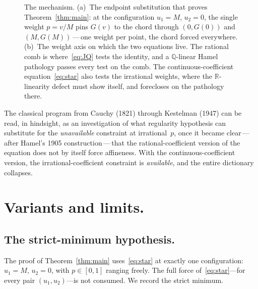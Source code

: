 \documentclass{article}
\theoremstyle{plain}
\theoremstyle{definition}
\newcommand{\R}{\mathbb{R}}
\newcommand{\Q}{\mathbb{Q}}
\begin{document}
\begin{figure}[ht]
{%
}
\caption{The mechanism. (a)~The endpoint substitution that proves
Theorem~\ref{thm:main}: at the configuration $u_1=M$, $u_2=0$, the
single weight $p=v/M$ pins $G(v)$ to the chord through $(0,G(0))$ and
$(M,G(M))$\,---\,one weight per point, the chord forced everywhere.
(b)~The weight axis on which the two equations live. The rational comb
is where~\eqref{eq:JQ} tests the identity, and a $\Q$-linear Hamel
pathology passes every test on the comb. The continuous-coefficient
equation~\eqref{eq:star} also tests the irrational weights, where the
$\R$-linearity defect must show itself, and forecloses on the
pathology there.}
\label{fig:mechanism}
\end{figure}

The classical program from Cauchy (1821) through Kestelman (1947)
can be read, in hindsight, as an investigation of what regularity
hypothesis can substitute for the \emph{unavailable} constraint at
irrational~$p$, once it became clear\,---\,after Hamel's 1905
construction\,---\,that the rational-coefficient version of the
equation does not by itself force affineness. With the
continuous-coefficient version, the irrational-coefficient constraint
is \emph{available}, and the entire dictionary collapses.

\section{Variants and limits.}
\label{sec:variants}

\subsection{The strict-minimum hypothesis.}
\label{ssec:weak}

The proof of Theorem~\ref{thm:main} uses~\eqref{eq:star} at exactly one
configuration: $u_1=M$, $u_2=0$, with $p\in[0,1]$ ranging freely. The
full force of~\eqref{eq:star}---for every pair $(u_1,u_2)$---is not
consumed. We record the strict minimum.
\end{document}
